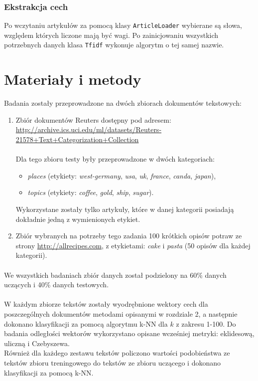 \documentclass{classrep}
\begin{document}
\subsubsection{Ekstrakcja cech}
Po wczytaniu artykułów za pomocą klasy \verb|ArticleLoader| wybierane są słowa, względem których liczone mają być wagi. Po zainicjowaniu wszystkich potrzebnych danych klasa \verb|Tfidf| wykonuje algorytm o tej samej nazwie.

\section{Materiały i metody}
Badania zostały przeprowadzone na dwóch zbiorach dokumentów tekstowych:\\
\begin{enumerate}
\item Zbiór dokumentów Reuters dostępny pod adresem:\\ \url{http://archive.ics.uci.edu/ml/datasets/Reuters-21578+Text+Categorization+Collection}\\\\
Dla tego zbioru testy były przeprowadzone w dwóch kategoriach:

\begin{itemize}
\item \textit{places} (etykiety: \textit{west-germany}, \textit{usa}, \textit{uk}, \textit{france}, \textit{canda}, \textit{japan}),
\item \textit{topics} (etykiety: \textit{coffee}, \textit{gold}, \textit{ship}, \textit{sugar}).\\
\end{itemize}
Wykorzystane zostały tylko artykuły, które w danej kategorii posiadają dokładnie jedną z wymienionych etykiet.\\


\item Zbiór wybranych na potrzeby tego zadania 100 krótkich opisów potraw ze strony \url{http://allrecipes.com}, z etykietami: \textit{cake} i \textit{pasta} (50 opisów dla każdej kategorii).

\end{enumerate}

\paragraph{}
We wszystkich badaniach zbiór danych został podzielony na 60\% danych uczących i 40\% danych testowych.
\paragraph{}
W każdym zbiorze tekstów zostały wyodrębnione wektory cech dla poszczególnych dokumentów metodami opisanymi w rozdziale 2, a następnie dokonano klasyfikacji za pomocą algorytmu k-NN dla $k$ z zakresu 1-100. Do badania odległości wektorów wykorzystano opisane wcześniej metryki: eklidesową, uliczną i Czebyszewa.\\
Również dla każdego zestawu tekstów policzono wartości podobieństwa ze tekstów zbioru treningowego do tekstów ze zbioru uczącego i dokonano klasyfikacji za pomocą k-NN.
\end{document}

